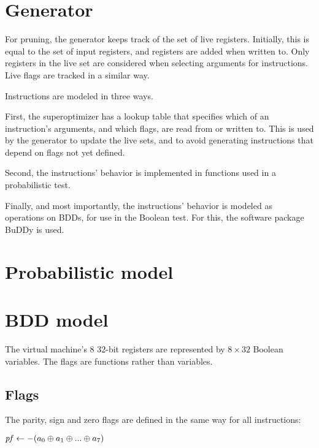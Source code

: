 \documentclass[a4paper,11pt]{kth-mag}
\renewcommand{\gets}{\leftarrow}
\newcommand{\XOR}{\oplus}
\newcommand{\NOT}{-}
\begin{document}
\section{Generator}

For pruning, the generator keeps track of the set of live registers.
Initially, this is equal to the set of input registers, and registers are added when written to.
Only registers in the live set are considered when selecting arguments for instructions.
Live flags are tracked in a similar way.


Instructions are modeled in three ways.

First, the superoptimizer has a lookup table that specifies which of an instruction's arguments, and which flags, are read from or written to.
This is used by the generator to update the live sets, and to avoid generating instructions that depend on flags not yet defined.

Second, the instructions' behavior is implemented in functions used in a probabilistic test.

Finally, and most importantly, the instructions' behavior is modeled as operations on BDDs, for use in the Boolean test.
For this, the software package BuDDy \cite{buddy} is used.

\section{Probabilistic model}

\section{BDD model}

The virtual machine's 8 32-bit registers are represented by $8 \times 32$ Boolean variables. %
The flags are functions rather than variables.

\subsection{Flags}

The parity, sign and zero flags are defined in the same way for all instructions:

\begin{codebox}
\zi $\id{pf} \gets \NOT(a_0 \XOR a_1 \XOR ... \XOR a_7)$
\end{codebox}
\end{document}
